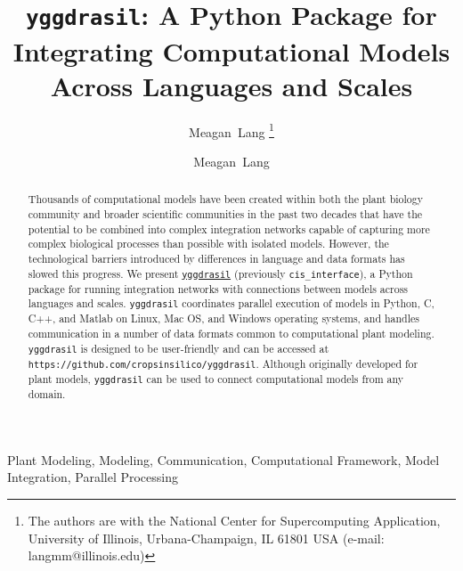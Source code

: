\documentclass[journal]{IEEEtran}
\newcommand{\pkg}{{\tt yggdrasil}{}}
\newcommand{\cis}{{\tt cis\_interface}{}}
\newcommand{\pkglink}{yggdrasil}
\newcommand{\hrefgit}[1]{\href{https://github.com/cropsinsilico/yggdrasil}{{#1}}}
\begin{document}
\ifieee
\else
	\shorttitle{{\pkg}}
\fi

\title{{\pkg}: A Python Package for Integrating Computational Models Across Languages and Scales}

\ifieee
	\author{Meagan~Lang%
	\thanks{The authors are with the National Center for Supercomputing Application, University of Illinois, Urbana-Champaign, IL 61801 USA (e-mail: langmm@illinois.edu)}}
\else
	\author{Meagan~Lang}

\fi


\ifieee
	\maketitle
\fi

\begin{abstract}
Thousands of computational models have been created within both the plant biology community and broader scientific communities in the past two decades that have the potential to be combined into complex integration networks capable of capturing more complex biological processes than possible with isolated models. However, the technological barriers introduced by differences in language and data formats has slowed this progress. We present \hrefgit{\pkg} (previously {\cis}), a Python package for running integration networks with connections between models across languages and scales. {\pkg} coordinates parallel execution of models in Python, C, C++, and Matlab on Linux, Mac OS, and Windows operating systems, and handles communication in a number of data formats common to computational plant modeling. {\pkg} is designed to be user-friendly and can be accessed at {\tt https://github.com/cropsinsilico/\pkglink}. Although originally developed for plant models, {\pkg} can be used to connect computational models from any domain.
\end{abstract}

\ifieee
	\begin{IEEEkeywords}
		Plant Modeling, Modeling, Communication, Computational Framework, Model Integration, Parallel Processing
	\end{IEEEkeywords}
	\IEEEpeerreviewmaketitle
\else
	\maketitle
\fi
\end{document}
